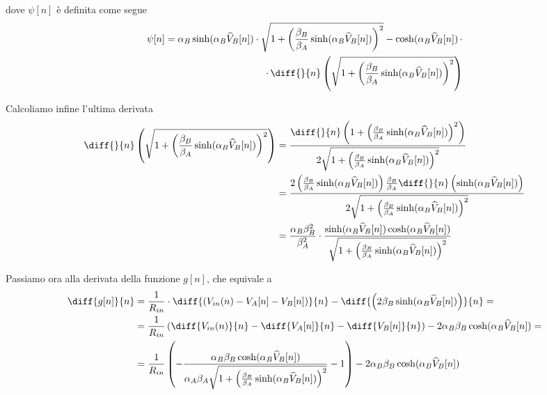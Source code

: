 		dove $\psi[n]$ è definita come segue
		\begin{equation}
			\begin{split}
				\psi[n] = \alpha_{B}\sinh(\alpha_{B}\widehat V_{B}[n])\cdot\sqrt{1+\left(\frac{\beta_{B}}{\beta_{A}}\sinh(\alpha_{B}\widehat V_{B}[n])\right)^{2}}-\cosh(\alpha_{B}\widehat V_{B}[n])\,\cdot\\
				\cdot\,\diff{}{n}\left(\sqrt{1+\left(\frac{\beta_{B}}{\beta_{A}}\sinh(\alpha_{B}\widehat V_{B}[n])\right)^{2}}\right)
			\end{split}
		\end{equation}
		\pagebreak
		
		Calcoliamo infine l'ultima derivata
		\vspace{-10px}
		\begin{equation}
			\begin{split}
				\diff{}{n}\left(\sqrt{1+\left(\frac{\beta_{B}}{\beta_{A}}\sinh(\alpha_{B}\widehat V_{B}[n])\right)^{2}}\right) &= \frac{\diff{}{n}\left(1+\left(\frac{\beta_{B}}{\beta_{A}}\sinh(\alpha_{B}\widehat V_{B}[n])\right)^{2}\right)}{2\sqrt{1+\left(\frac{\beta_{B}}{\beta_{A}}\sinh(\alpha_{B}\widehat V_{B}[n])\right)^{2}}}\\
				&= \frac{2\left(\frac{\beta_{B}}{\beta_{A}}\sinh(\alpha_{B}\widehat V_{B}[n])\right)\frac{\beta_{B}}{\beta_{A}}\diff{}{n}\left(\sinh(\alpha_{B}\widehat V_{B}[n])\right)}{2\sqrt{1+\left(\frac{\beta_{B}}{\beta_{A}}\sinh(\alpha_{B}\widehat V_{B}[n])\right)^{2}}}\\
				&= \frac{\alpha_{B}\beta_{B}^{2}}{\beta_{A}^{2}}\cdot\frac{\sinh(\alpha_{B}\widehat V_{B}[n])\cosh(\alpha_{B}\widehat V_{B}[n])}{\sqrt{1+\left(\frac{\beta_{B}}{\beta_{A}}\sinh(\alpha_{B}\widehat V_{B}[n])\right)^{2}}}
			\end{split}
		\end{equation}

		Passiamo ora alla derivata della funzione $g[n]$, che equivale a
		\begin{equation}
			\begin{split}
				\diff{g[n]}{n} &= \frac{1}{R_{in}}\cdot\diff{\left(V_{in}(n)-V_{A}[n]-V_{B}[n]\right)}{n}-\diff{\left(2\beta_{B}\sinh(\alpha_{B}\widehat V_{B}[n])\right)}{n} =\\
				&= \frac{1}{R_{in}}\left(\diff{V_{in}(n)}{n}-\diff{V_{A}[n]}{n}-\diff{V_{B}[n]}{n}\right)-2\alpha_{B}\beta_{B}\cosh(\alpha_{B}\widehat V_{B}[n]) =\\
				&= \frac{1}{R_{in}}\left(-\frac{\alpha_{B}\beta_{B}\cosh(\alpha_{B}\widehat V_{B}[n])}{\alpha_{A}\beta_{A}\sqrt{1+\left(\frac{\beta_{B}}{\beta_{A}}\sinh(\alpha_{B}\widehat V_{B}[n])\right)^{2}}}-1\right)-2\alpha_{B}\beta_{B}\cosh(\alpha_{B}\widehat V_{B}[n])
			\end{split}
		\end{equation}
		\vspace{-8px}
		
